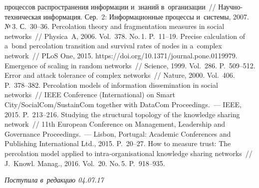 \begin{multicols}{2}
{{\begin{thebibliography}{99}
процессов распространения информации и~знаний в~организации~//\linebreak  
На\-уч\-но-тех\-ни\-че\-ская информация. Сер.~2: Информационные процессы 
и~системы, 2007. №\,3. С.~30--36.
Percolation theory and fragmentation measures in social networks~// Physica~A, 2006. Vol.~378. No.\,1. P.~11--19.
 Precise calculation of a~bond 
percolation transition and survival rates of nodes in a~complex network~// 
PLoS One, 2015. {\sf https://doi.org/10.1371/journal.pone.0119979}.
 Emergence of scaling in random networks~// 
Science, 1999. Vol.~286. P.~509--512.
 Error and attack tolerance of 
complex networks~// Nature, 2000. Vol.~406. P.~378--382.
 Percolation models of information dissemination in social 
networks~// IEEE Conference (International) on Smart City/SocialCom/SustainCom together 
with DataCom Proceedings.~--- IEEE, 2015. P.~213--216.
 Studying the structural topology of the 
knowledge sharing network~// 11th European Conference on Management, Leadership and 
Governance Proceedings.~--- Lisbon, Portugal: Academic Conferences and 
Publishing International Ltd., 2015. P.~20--27.
 How to measure trust: 
The percolation model 
applied to intra-organisational knowledge sharing networks~// J.~Knowl. Manag., 
2016. Vol.~20. No.\,5. P.~918--935.
 \end{thebibliography}

 }
 }

\end{multicols}

\vspace*{-7pt}

\hfill{\small\textit{Поступила в~редакцию 04.07.17}}

\vspace*{6pt}

